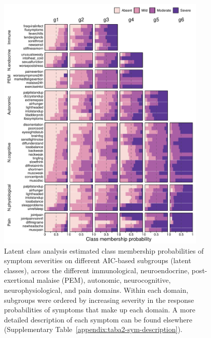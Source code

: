 \begin{figure}[htbp]
    \centering
    \includegraphics[width=0.9\textwidth]{chapter/2024-sym-domains/figures/fig4-lca-response-probabilities-aic-absent.pdf}
    \caption[Latent class analysis estimated class membership probabilities of symptom severities on different AIC-based subgroups, across the different domains]{Latent class analysis estimated class membership probabilities of symptom severities on different AIC-based subgroups (latent classes), across the different immunological, neuroendocrine, post-exertional malaise (PEM), autonomic, neurocognitive, neurophysiological, and pain domains. Within each domain, subgroups were ordered by increasing severity in the response probabilities of symptoms that make up each domain. A more detailed description of each symptom can be found elsewhere (Supplementary Table~\ref{appendix:taba2-sym-description}).}
    \label{fig:fig4-lca-response-probabilities-aic-absent}
\end{figure}


